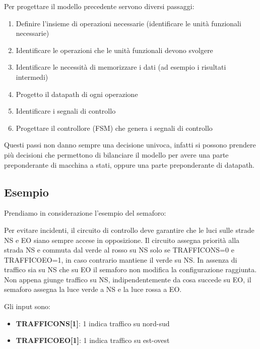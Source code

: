 \documentclass[a4paper]{article}
\theoremstyle{break}
\theoremstyle{break}
\theoremstyle{break}
\theoremstyle{break}
\begin{document}
Per progettare il modello precedente servono diversi passaggi:
\begin{enumerate}
  \item Definire l'insieme di operazioni necessarie (identificare le unità funzionali necessarie)
  \item Identificare le operazioni che le unità funzionali devono svolgere 
  \item Identificare le necessità di memorizzare i dati (ad esempio i risultati intermedi)
  \item Progetto il datapath di ogni operazione
  \item Identificare i segnali di controllo
  \item Progettare il controllore (FSM) che genera i segnali di controllo
\end{enumerate}
Questi passi non danno sempre una decisione univoca, infatti si possono prendere più decisioni
che permettono di bilanciare il modello per avere una parte preponderante di macchina a stati,
oppure una parte preponderante di datapath.
\subsection{Esempio}
    Prendiamo in considerazione l'esempio del semaforo:

    Per evitare incidenti, il circuito di controllo deve garantire che le luci sulle
    strade NS e EO siano sempre accese in opposizione. Il circuito assegna
    priorità alla strada NS e commuta dal verde al rosso su NS solo se
    TRAFFICONS=0 e TRAFFICOEO=1, in caso contrario mantiene il verde
    su NS. In assenza di traffico sia su NS che su EO il semaforo non modifica
    la configurazione raggiunta. Non appena giunge traffico su NS,
    indipendentemente da cosa succede su EO, il semaforo assegna la luce
    verde a NS e la luce rossa a EO.

    Gli input sono:
    \begin{itemize}
      \item \textbf{TRAFFICONS[1]}: 1 indica traffico su nord-sud
      \item \textbf{TRAFFICOEO[1]}: 1 indica traffico su est-ovest
    \end{itemize}
\end{document}
